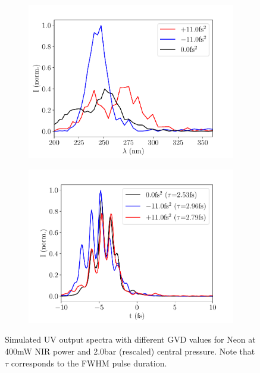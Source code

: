 \documentclass[a4paper]{jpconf}
\begin{document}
\begin{figure}[h]
\centering
 \begin{subfigure}{0.5\textwidth}
\includegraphics[width=\textwidth]{im/Ne_chirp}
\caption{}\label{im:chirp_Ar}
\end{subfigure}
 \begin{subfigure}{0.5\textwidth}
\includegraphics[width=\textwidth]{im/temporal_Ne_chirp}
\caption{}\label{im:chirp_Ne}
\end{subfigure}
\caption{Simulated UV output spectra with different GVD values for Neon at 400mW NIR power and 2.0bar (rescaled) central pressure. Note that $\tau$ corresponds to the FWHM pulse duration.}\label{im:chirp}
\end{figure}
\end{document}
